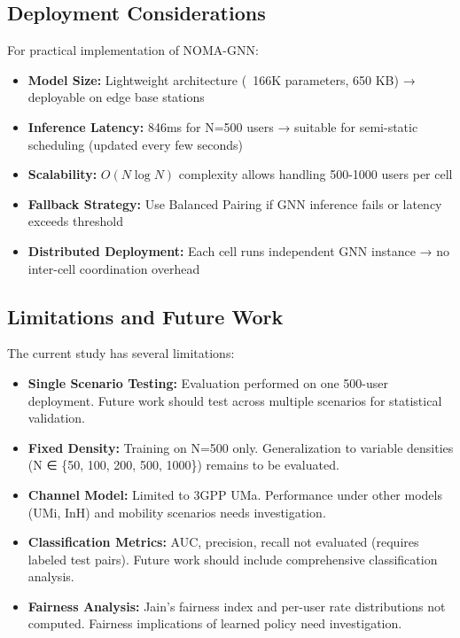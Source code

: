 \subsection{Deployment Considerations}

For practical implementation of NOMA-GNN:

\begin{itemize}
    \item \textbf{Model Size:} Lightweight architecture (~166K parameters, 650 KB) → deployable on edge base stations
    \item \textbf{Inference Latency:} 846ms for N=500 users → suitable for semi-static scheduling (updated every few seconds)
    \item \textbf{Scalability:} $O(N \log N)$ complexity allows handling 500-1000 users per cell
    \item \textbf{Fallback Strategy:} Use Balanced Pairing if GNN inference fails or latency exceeds threshold
    \item \textbf{Distributed Deployment:} Each cell runs independent GNN instance → no inter-cell coordination overhead
\end{itemize}

\subsection{Limitations and Future Work}

The current study has several limitations:

\begin{itemize}
    \item \textbf{Single Scenario Testing:} Evaluation performed on one 500-user deployment. Future work should test across multiple scenarios for statistical validation.
    
    \item \textbf{Fixed Density:} Training on N=500 only. Generalization to variable densities (N ∈ \{50, 100, 200, 500, 1000\}) remains to be evaluated.
    
    \item \textbf{Channel Model:} Limited to 3GPP UMa. Performance under other models (UMi, InH) and mobility scenarios needs investigation.
    
    \item \textbf{Classification Metrics:} AUC, precision, recall not evaluated (requires labeled test pairs). Future work should include comprehensive classification analysis.
    
    \item \textbf{Fairness Analysis:} Jain's fairness index and per-user rate distributions not computed. Fairness implications of learned policy need investigation.
\end{itemize}

